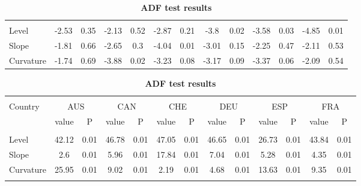\documentclass[12pt,bibliography=totoc]{article}
\begin{document}
\begin{appendices}
\begin{table}
\begin{subtable}[t]{1\textwidth}
\begin{tabular}{l cc cc cc cc cc cc}
\hline       \\ [-1.5ex] 

Level	&	-2.53 & 0.35 & -2.13 & 0.52 & -2.87 & 0.21 & -3.8 & 0.02 & -3.58 & 0.03 & -4.85 & 0.01	\\
Slope	&	-1.81 & 0.66 & -2.65 & 0.3 & -4.04 & 0.01 & -3.01 & 0.15 & -2.25 & 0.47 & -2.11 & 0.53	\\
Curvature	&	-1.74 & 0.69 & -3.88 & 0.02 & -3.23 & 0.08 & -3.17 & 0.09 & -3.37 & 0.06 & -2.09 & 0.54\\
\hline
\end{tabular}
\caption{\textbf{ADF test results}}
\end{subtable}
\hspace{\fill}
\bigskip 

\begin{subtable}[t]{1\textwidth}
\centering%
\begin{tabular}{l cc cc cc cc cc cc}%
\hline\hline \\ [-1.5ex]                         %

Country	&	\multicolumn{2}{c}{AUS}			&	\multicolumn{2}{c}{CAN}			&	\multicolumn{2}{c}{CHE}			&	\multicolumn{2}{c}{DEU}			&	\multicolumn{2}{c}{ESP}			&	\multicolumn{2}{c}{FRA}			\\[0.5ex] 

 & value &P & value &P& value &P & value &P& value &P & value &P\\

\hline       \\ [-1.5ex] 

Level	&	42.12 & 0.01 & 46.78 & 0.01 & 47.05 & 0.01 & 46.65 & 0.01 & 26.73 & 0.01 & 43.84 & 0.01	\\
Slope	&	2.6 & 0.01 & 5.96 & 0.01 & 17.84 & 0.01 & 7.04 & 0.01 & 5.28 & 0.01 & 4.35 & 0.01	\\
Curvature	&	25.95 & 0.01 & 9.02 & 0.01 & 2.19 & 0.01 & 4.68 & 0.01 & 13.63 & 0.01 & 9.35 & 0.01	\\


\hline   \\ [-1.5ex]    


\end{tabular}
\end{subtable}
\end{table}
\end{appendices}
\end{document}
